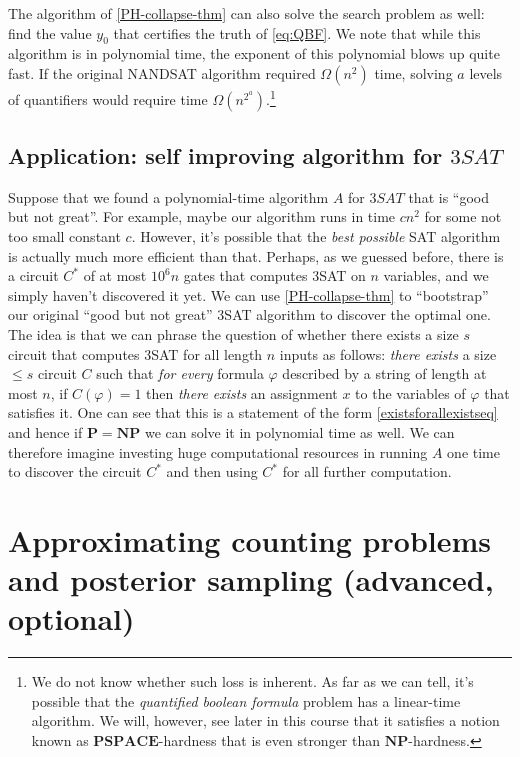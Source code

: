 The algorithm of \cref{PH-collapse-thm} can also solve the search
problem as well: find the value \(y_0\) that certifies the truth of
\eqref{eq:QBF}. We note that while this algorithm is in polynomial time,
the exponent of this polynomial blows up quite fast. If the original
NANDSAT algorithm required \(\Omega(n^2)\) time, solving \(a\) levels of
quantifiers would require time \(\Omega(n^{2^a})\).\footnote{We do not
  know whether such loss is inherent. As far as we can tell, it's
  possible that the \emph{quantified boolean formula} problem has a
  linear-time algorithm. We will, however, see later in this course that
  it satisfies a notion known as \(\mathbf{PSPACE}\)-hardness that is
  even stronger than \(\mathbf{NP}\)-hardness.}

\subsection{Application: self improving algorithm for
\(3\ensuremath{\mathit{SAT}}\)}\label{selfimprovingsat}

Suppose that we found a polynomial-time algorithm \(A\) for
\(3\ensuremath{\mathit{SAT}}\) that is ``good but not great''. For
example, maybe our algorithm runs in time \(cn^2\) for some not too
small constant \(c\). However, it's possible that the \emph{best
possible} SAT algorithm is actually much more efficient than that.
Perhaps, as we guessed before, there is a circuit \(C^*\) of at most
\(10^6 n\) gates that computes 3SAT on \(n\) variables, and we simply
haven't discovered it yet. We can use \cref{PH-collapse-thm} to
``bootstrap'' our original ``good but not great'' 3SAT algorithm to
discover the optimal one. The idea is that we can phrase the question of
whether there exists a size \(s\) circuit that computes 3SAT for all
length \(n\) inputs as follows: \emph{there exists} a size \(\leq s\)
circuit \(C\) such that \emph{for every} formula \(\varphi\) described
by a string of length at most \(n\), if \(C(\varphi)=1\) then
\emph{there exists} an assignment \(x\) to the variables of \(\varphi\)
that satisfies it. One can see that this is a statement of the form
\eqref{existsforallexistseq} and hence if \(\mathbf{P}=\mathbf{NP}\) we
can solve it in polynomial time as well. We can therefore imagine
investing huge computational resources in running \(A\) one time to
discover the circuit \(C^*\) and then using \(C^*\) for all further
computation.

\section{Approximating counting problems and posterior sampling
(advanced, optional)}\label{Approximating-counting-pr}

